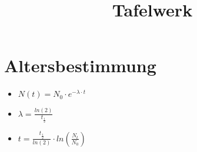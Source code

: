 \documentclass[a4paper,12pt]{scrartcl}
\begin{document}
\title{Tafelwerk}
\maketitle


\section{Altersbestimmung} \label{sec:Altersbestimung}

\begin{itemize}
\item $N(t) = N_0 \cdot e^{- \lambda \cdot t}$ 
\item $\lambda = \frac{ln(2)}{t_{\frac{1}{2}}}$
\item $t = \frac{t_{\frac{1}{2}}}{ln(2)} \cdot ln (\frac{N_t}{N_0})$
\end{itemize}
\end{document}
